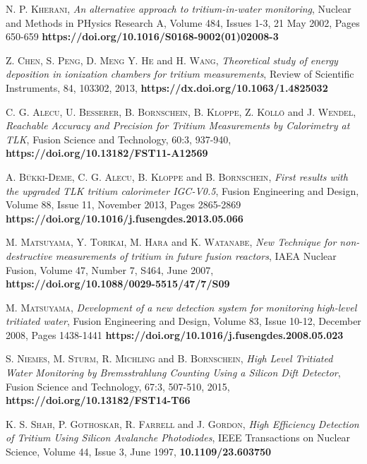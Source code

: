 \begin{thebibliography}{100}
 \textsc{N. P. Kherani},
\textit{An alternative approach to tritium-in-water monitoring}, Nuclear and Methods in PHysics Research A, Volume 484, Issues 1-3, 21 May 2002, Pages 650-659 \textbf{https://doi.org/10.1016/S0168-9002(01)02008-3}

 \textsc{Z. Chen}, \textsc{S. Peng}, \textsc{D. Meng} \textsc{Y. He} and \textsc{H. Wang},
\textit{Theoretical study of energy deposition in ionization chambers for tritium measurements}, Review of Scientific Instruments, 84, 103302, 2013, \textbf{https://dx.doi.org/10.1063/1.4825032}

 \textsc{C. G. Alecu}, \textsc{U. Besserer}, \textsc{B. Bornschein}, \textsc{B. Kloppe}, \textsc{Z. Köllö} and \textsc{J. Wendel},
\textit{Reachable Accuracy and Precision for Tritium Measurements by Calorimetry at TLK}, Fusion Science and Technology, 60:3, 937-940, \textbf{https://doi.org/10.13182/FST11-A12569}

 \textsc{A. Bükki-Deme}, \textsc{C. G. Alecu}, \textsc{B. Kloppe} and \textsc{B. Bornschein},
\textit{First results with the upgraded TLK tritium calorimeter IGC-V0.5}, Fusion Engineering and Design, Volume 88, Issue 11, November 2013, Pages 2865-2869 \textbf{https://doi.org/10.1016/j.fusengdes.2013.05.066}

 \textsc{M. Matsuyama}, \textsc{Y. Torikai}, \textsc{M. Hara} and \textsc{K. Watanabe},
\textit{New Technique for non-destructive measurements of tritium in future fusion reactors}, IAEA Nuclear Fusion, Volume 47, Number 7, S464, June 2007, \textbf{https://doi.org/10.1088/0029-5515/47/7/S09}

 \textsc{M. Matsuyama},
\textit{Development of a new detection system for monitoring high-level tritiated water}, Fusion Engineering and Design, Volume 83, Issue 10-12, December 2008, Pages 1438-1441 \textbf{https://doi.org/10.1016/j.fusengdes.2008.05.023}

 \textsc{S. Niemes}, \textsc{M. Sturm}, \textsc{R. Michling} and \textsc{B. Bornschein},
\textit{High Level Tritiated Water Monitoring by Bremsstrahlung Counting Using a Silicon Dift Detector}, Fusion Science and Technology, 67:3, 507-510, 2015, \textbf{https://doi.org/10.13182/FST14-T66}

 \textsc{K. S. Shah}, \textsc{P. Gothoskar}, \textsc{R. Farrell} and \textsc{J. Gordon},
\textit{High Efficiency Detection of Tritium Using Silicon Avalanche Photodiodes}, IEEE Transactions on Nuclear Science, Volume 44, Issue 3, June 1997, \textbf{10.1109/23.603750}


\end{thebibliography}
